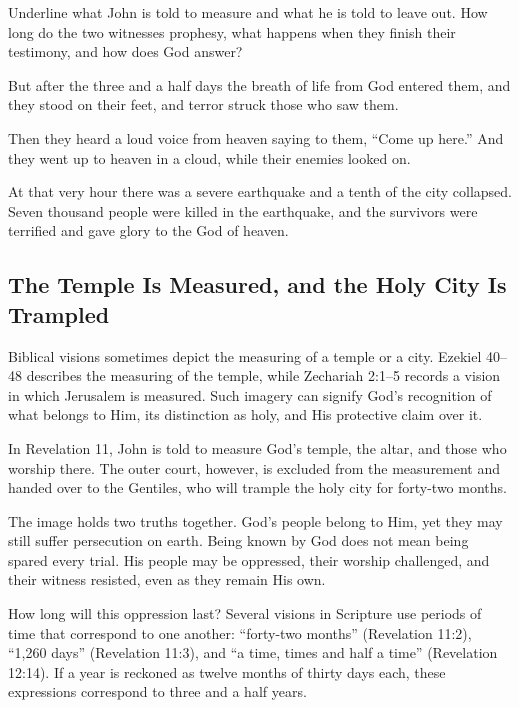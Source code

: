 \begin{ScriptureBox2}{Underline what John is told to measure and what he is told to leave out. How long do the two witnesses prophesy, what happens when they finish their testimony, and how does God answer?}
\item[11:11] But after the three and a half days the breath of life from God entered them, and they stood on their feet, and terror struck those who saw them.

\item[11:12] Then they heard a loud voice from heaven saying to them, ``Come up here.'' And they went up to heaven in a cloud, while their enemies looked on.

\item[11:13] At that very hour there was a severe earthquake and a tenth of the city collapsed. Seven thousand people were killed in the earthquake, and the survivors were terrified and gave glory to the God of heaven.

\end{ScriptureBox2}

\subsection{The Temple Is Measured, and the Holy City Is Trampled}

Biblical visions sometimes depict the measuring of a temple or a city. Ezekiel 40--48 describes the measuring of the temple, while Zechariah 2:1--5 records a vision in which Jerusalem is measured. Such imagery can signify God's recognition of what belongs to Him, its distinction as holy, and His protective claim over it.

In Revelation 11, John is told to measure God's temple, the altar, and those who worship there. The outer court, however, is excluded from the measurement and handed over to the Gentiles, who will trample the holy city for forty-two months.

The image holds two truths together. God's people belong to Him, yet they may still suffer persecution on earth. Being known by God does not mean being spared every trial. His people may be oppressed, their worship challenged, and their witness resisted, even as they remain His own.

How long will this oppression last? Several visions in Scripture use periods of time that correspond to one another: “forty-two months” (Revelation 11:2), “1,260 days” (Revelation 11:3), and “a time, times and half a time” (Revelation 12:14). If a year is reckoned as twelve months of thirty days each, these expressions correspond to three and a half years.

